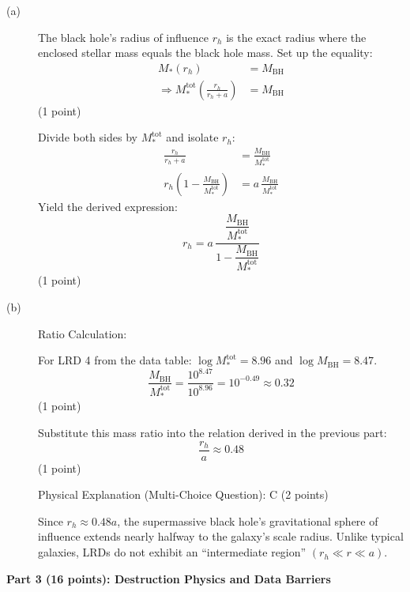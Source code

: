 \begin{description}
\item[(a)] The black hole's radius of influence $r_h$ is the exact radius
  where the enclosed stellar mass equals the black hole mass. Set up the
  equality:
  \begin{align*}
    M_*(r_h) &= M_{\mathrm{BH}} \\
    \Rightarrow M_*^{\mathrm{tot}} \left( \frac{r_h}{r_h + a} \right)
      &= M_{\mathrm{BH}}
  \end{align*}
  \hfill(1 point)

  Divide both sides by $M_*^{\mathrm{tot}}$ and isolate $r_h$:
  \begin{align*}
    \frac{r_h}{r_h + a} &= \frac{M_{\mathrm{BH}}}{M_*^{\mathrm{tot}}} \\
    r_h \left( 1 - \frac{M_{\mathrm{BH}}}{M_*^{\mathrm{tot}}} \right)
      &= a\,\frac{M_{\mathrm{BH}}}{M_*^{\mathrm{tot}}}
  \end{align*}
  Yield the derived expression:
  \[
  r_h = a\,\frac{\dfrac{M_{\mathrm{BH}}}{M_*^{\mathrm{tot}}}}
               {1 - \dfrac{M_{\mathrm{BH}}}{M_*^{\mathrm{tot}}}}
  \]
  \hfill(1 point)

\item[(b)] Ratio Calculation:

  For LRD 4 from the data table: $\log M_*^{\mathrm{tot}} = 8.96$ and
  $\log M_{\mathrm{BH}} = 8.47$.
  \[
  \frac{M_{\mathrm{BH}}}{M_*^{\mathrm{tot}}}
    = \frac{10^{8.47}}{10^{8.96}} = 10^{-0.49} \approx 0.32
  \]
  \hfill(1 point)

  Substitute this mass ratio into the relation derived in the previous part:
  \[ \frac{r_h}{a} \approx 0.48 \]
  \hfill(1 point)

  Physical Explanation (Multi-Choice Question): C \hfill(2 points)

  Since $r_h \approx 0.48a$, the supermassive black hole's gravitational
  sphere of influence extends nearly halfway to the galaxy's scale radius.
  Unlike typical galaxies, LRDs do not exhibit an ``intermediate region''
  $(r_h \ll r \ll a)$.
\end{description}

\medskip\noindent\textbf{Part 3 (16 points): Destruction Physics and Data Barriers}

